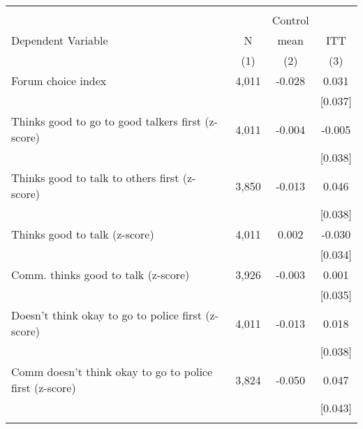 \begin{tabular}{lccc}
\hline \noalign{\smallskip} &  &  & \\
 &  & Control & \\
Dependent Variable & N & mean & ITT\\
 & (1) & (2) & (3)\\
\noalign{\smallskip}\hline \noalign{\smallskip}\quad Forum choice index & 4,011 & -0.028 & 0.031\\
 &  &  & [0.037]\\
\quad Thinks good to go to good talkers first (z-score) & 4,011 & -0.004 & -0.005\\
 &  &  & [0.038]\\
\quad Thinks good to talk to others first (z-score) & 3,850 & -0.013 & 0.046\\
 &  &  & [0.038]\\
\quad Thinks good to talk (z-score) & 4,011 & 0.002 & -0.030\\
 &  &  & [0.034]\\
\quad Comm. thinks good to talk (z-score) & 3,926 & -0.003 & 0.001\\
 &  &  & [0.035]\\
\quad Doesn't think okay to go to police first (z-score) & 4,011 & -0.013 & 0.018\\
 &  &  & [0.038]\\
\quad Comm doesn't think okay to go to police first (z-score) & 3,824 & -0.050 & 0.047\\
 &  &  & [0.043]\\
\noalign{\smallskip}\hline\end{tabular}
